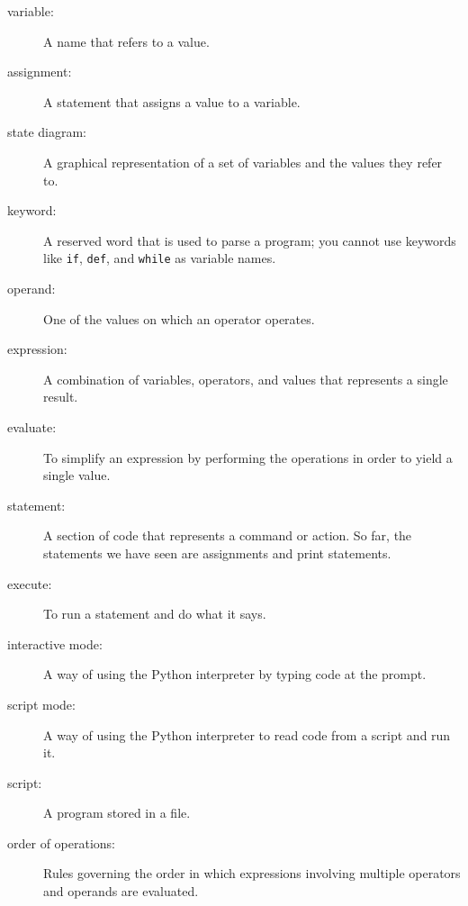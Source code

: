 \begin{description}

\item[variable:]  A name that refers to a value.

\item[assignment:]  A statement that assigns a value to a variable.

\item[state diagram:]  A graphical representation of a set of variables and the
values they refer to.

\item[keyword:]  A reserved word that is used to parse a
program; you cannot use keywords like {\tt if}, {\tt  def}, and {\tt while} as
variable names.

\item[operand:]  One of the values on which an operator operates.

\item[expression:]  A combination of variables, operators, and values that
represents a single result.

\item[evaluate:]  To simplify an expression by performing the operations
in order to yield a single value.

\item[statement:]  A section of code that represents a command or action.  So
far, the statements we have seen are assignments and print statements.

\item[execute:]  To run a statement and do what it says.

\item[interactive mode:] A way of using the Python interpreter by
typing code at the prompt.

\item[script mode:] A way of using the Python interpreter to read
code from a script and run it.

\item[script:] A program stored in a file.

\item[order of operations:]  Rules governing the order in which
expressions involving multiple operators and operands are evaluated.


\end{description}
